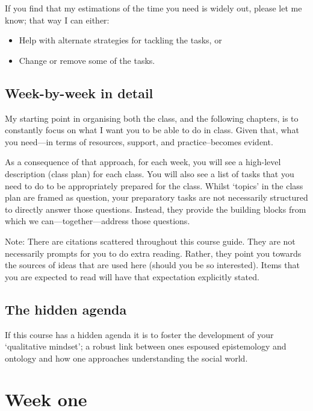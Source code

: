 \documentclass[]{book}
\providecommand{\tightlist}{%
  \setlength{\itemsep}{0pt}\setlength{\parskip}{0pt}}
\theoremstyle{definition}
\theoremstyle{definition}
\theoremstyle{definition}
\theoremstyle{remark}
\begin{document}
If you find that my estimations of the time you need is widely out,
please let me know; that way I can either:

\begin{itemize}
\tightlist
\item
  Help with alternate strategies for tackling the tasks, or
\item
  Change or remove some of the tasks.
\end{itemize}

\hypertarget{week-by-week}{%
\section{Week-by-week in detail}\label{week-by-week}}

My starting point in organising both the class, and the following
chapters, is to constantly focus on what I want you to be able to do in
class. Given that, what you need---in terms of resources, support, and
practice--becomes evident.

As a consequence of that approach, for each week, you will see a
high-level description (class plan) for each class. You will also see a
list of tasks that you need to do to be appropriately prepared for the
class. Whilst `topics' in the class plan are framed as question, your
preparatory tasks are not necessarily structured to directly answer
those questions. Instead, they provide the building blocks from which we
can---together---address those questions.

Note: There are citations scattered throughout this course guide. They
are not necessarily prompts for you to do extra reading. Rather, they
point you towards the sources of ideas that are used here (should you be
so interested). Items that you are expected to read will have that
expectation explicitly stated.

\hypertarget{the-hidden-agenda}{%
\section{The hidden agenda}\label{the-hidden-agenda}}

If this course has a hidden agenda it is to foster the development of
your `qualitative mindset'; a robust link between ones espoused
epistemology and ontology and how one approaches understanding the
social world.

\hypertarget{w1-details}{%
\chapter{Week one}\label{w1-details}}
\end{document}

